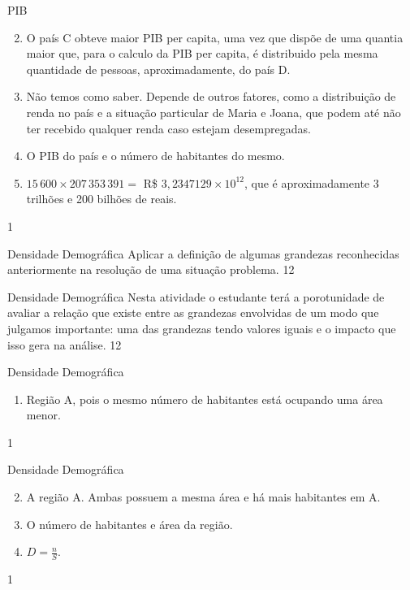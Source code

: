 \clearmargin
\begin{answer}{PIB}
{
\begin{enumerate}\setcounter{enumi}{1}
\item O país C obteve maior PIB per capita, uma vez que dispõe de uma quantia maior que, para o calculo da PIB per capita, é distribuido pela mesma quantidade de pessoas, aproximadamente, do país D.

\item {} 
Não temos como saber. Depende de outros fatores, como a distribuição de renda no país e a situação particular de Maria e Joana, que podem até não ter recebido qualquer renda caso estejam desempregadas.

\item {} 
O PIB do país e o número de habitantes do mesmo.

\item {} 
\(15\,600 \times 207\,353\,391 =\) R\$ \(3,2347129 \times 10^{12}\), que é aproximadamente 3 trilhões e 200 bilhões de reais.
\end{enumerate}
}{1}
\end{answer}
\begin{objectives}{Densidade Demográfica}
{
Aplicar a definição de algumas grandezas reconhecidas anteriormente na resolução de uma situação problema.
}{1}{2}
\end{objectives}
\begin{sugestions}{Densidade Demográfica}
{
Nesta atividade o estudante terá a porotunidade de avaliar a relação que existe entre as grandezas envolvidas de um modo que julgamos importante: uma das grandezas tendo valores iguais e o impacto que isso gera na análise.
}{1}{2}
\end{sugestions}
\begin{answer}{Densidade Demográfica}
{
\begin{enumerate}
\item Região A, pois o mesmo número de habitantes está ocupando uma área menor.
\end{enumerate}
}{1}
\end{answer}
\clearmargin
\begin{answer}{Densidade Demográfica}
{
\begin{enumerate}\setcounter{enumi}{1}
\item A região A. Ambas possuem a mesma área e há mais habitantes em A.

\item {} 
O número de habitantes e área da região.

\item {} 
\(D = \frac{n}{S}\).
\end{enumerate}
}{1}
\end{answer}
